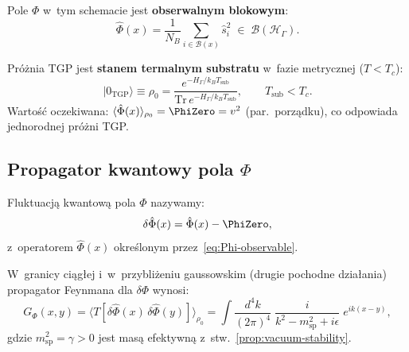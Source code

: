 Pole $\Phi$ w~tym schemacie jest \textbf{obserwalnym blokowym}:
\begin{equation}\label{eq:Phi-observable}
    \hat{\Phi}(x) = \frac{1}{N_B}
    \sum_{i \in \mathcal{B}(x)} \hat{s}_i^2
    \;\in\; \mathcal{B}(\mathcal{H}_\Gamma).
\end{equation}

\begin{proposition}\label{prop:substrate-vacuum}
Próżnia TGP jest \textbf{stanem termalnym substratu}
w~fazie metrycznej ($T < T_c$):
\begin{equation}\label{eq:vacuum-thermal}
    |0_{\mathrm{TGP}}\rangle
    \equiv \rho_0
    = \frac{e^{-H_\Gamma/k_B T_{\mathrm{sub}}}}
           {\mathrm{Tr}\,e^{-H_\Gamma/k_B T_{\mathrm{sub}}}},
    \qquad T_{\mathrm{sub}} < T_c.
\end{equation}
Wartość oczekiwana:
$\langle\hat{\Phi}(x)\rangle_{\rho_0} = \PhiZero = v^2$
(par.\ porządku), co odpowiada jednorodnej próżni TGP.
\end{proposition}

\subsection{Propagator kwantowy pola $\Phi$}%
\label{app:E-propagator}

\begin{definition}\label{def:Phi-fluct}
Fluktuacją kwantową pola $\Phi$ nazywamy:
\begin{equation}\label{eq:delta-Phi}
    \delta\hat{\Phi}(x)
    = \hat{\Phi}(x) - \PhiZero,
\end{equation}
z~operatorem $\hat{\Phi}(x)$ określonym przez~\eqref{eq:Phi-observable}.
\end{definition}

\begin{theorem}\label{thm:propagator}
W~granicy ciągłej i~w~przybliżeniu gaussowskim (drugie pochodne
działania) propagator Feynmana dla $\delta\Phi$ wynosi:
\begin{equation}\label{eq:propagator}
    G_\Phi(x, y)
    = \langle T[\delta\hat{\Phi}(x)\,\delta\hat{\Phi}(y)]\rangle_{\rho_0}
    = \int \frac{d^4k}{(2\pi)^4}\;
      \frac{i}{k^2 - m_{\mathrm{sp}}^2 + i\epsilon}\;
      e^{ik(x-y)},
\end{equation}
gdzie $m_{\mathrm{sp}}^2 = \gamma > 0$ jest masą efektywną
z~stw.~\ref{prop:vacuum-stability}.
\end{theorem}

